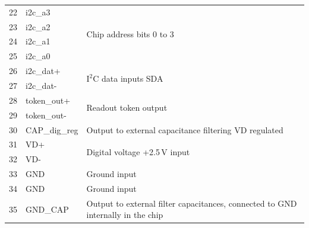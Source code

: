 \begin{table}[h]
\begin{center}
{\begin{tabular}{cll}
	22 & i2c\_a3         & \multirow{4}{*}{Chip address bits 0 to 3} \\
	23 & i2c\_a2         &  \\
	24 & i2c\_a1         &  \\
	25 & i2c\_a0         &  \\
	26 & i2c\_dat+       & \multirow{2}{*}{I$^2$C data inputs SDA} \\
	27 & i2c\_dat-       &  \\
	28 & token\_out+     & \multirow{2}{*}{Readout token output} \\
	29 & token\_out-     &  \\
	30 & CAP\_dig\_reg   & Output to external capacitance filtering VD regulated \\
	31 & VD+             & \multirow{2}{*}{Digital voltage +2.5\,V input} \\
	32 & VD-             &  \\
	33 & GND             & Ground input  \\
	34 & GND             & Ground input  \\
	35 & GND\_CAP        & Output to external filter capacitances, connected to GND internally in the chip \\
	\bottomrule %
	\end{tabular}
	}
    \end{center}
\end{table}


